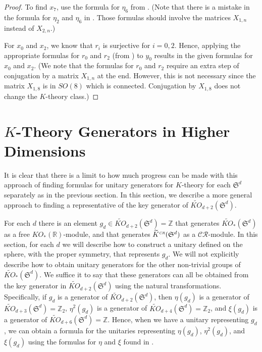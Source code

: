 \documentclass[12pt, reqno]{amsart}
\theoremstyle{definition}
\def\R{{\mathbb R}}
\def\Z{{\mathbb Z}}
\def\crr{^{\scriptscriptstyle {\it CR}}}
\newcommand{\fS}{\mathfrak S}
\begin{document}
\begin{proof}
To find $x_7$, use the formula for $\eta_6$ from \cite{Boer2020}. (Note that there is a mistake in the formula for $\eta_2$ and $\eta_6$ in \cite{Boer2020}. Those formulas should involve the matrices $X_{1,n}$ instead of $X_{2,n}$.)

For $x_0$ and $x_2$, we know that $r_i$ is surjective for $i = 0,2$. Hence, applying the appropriate formulas for $r_0$ and $r_2$ (from \cite{Boer2020}) to $y_0$ 
results in the given formulas for $x_0$ and $x_2$. (We note that the formulas for $r_0$ and $r_2$ require an extra step of conjugation by a matrix $X_{1, n}$ at the end. However, this is not necessary since the matrix $X_{1,8}$ is in $SO(8)$ which is connected. Conjugation by $X_{1,8}$ does not change the $K$-theory class.)
\end{proof}

\section{$K$-Theory Generators in Higher Dimensions} \label{Section:S^n unitaries}

It is clear that there is a limit to how much progress can be made with this approach of finding formulas for unitary generators for $K$-theory for each $\fS^d$ separately as in the previous section. In this section, we describe a more general approach to finding a representative of the key generator of $\widetilde{KO}_{d+2}(\fS^d)$.

For each $d$ there is an element $g_d \in \widetilde{KO}_{d+2}(\fS^d) = \Z$ that generates $\widetilde{KO}_*(\fS^d)$ as a free $KO_*(\R)$-module, and that generates $\widetilde{K}\crr(\fS^d)$ as a $\mathcal{CR}$-module. In this section, for each $d$ we will describe how to construct a unitary defined on the sphere, with the proper symmetry, that represents $g_d$. We will not explicitly describe how to obtain unitary generators for the other non-trivial groups of $\widetilde{KO}_*(\fS^d)$. We suffice it to say that these generators can all be obtained from the key generator in $\widetilde{KO}_{d+2}(\fS^d)$ using the natural transformations. Specifically, if $g_d$ is a generator of $\widetilde{KO}_{d+2}(\fS^d)$, 
then $\eta(g_d)$ is a generator of $\widetilde{KO}_{d+3}(\fS^d) = \Z_2$,
 $\eta^2(g_d)$ is a generator of $\widetilde{KO}_{d+4}(\fS^d) = \Z_2$,
 and $\xi(g_d)$ is a generator of $\widetilde{KO}_{d+6}(\fS^d) = \Z$. 
 Hence, when we have a unitary representing $g_d$, we can obtain a formula for the unitaries representing $\eta(g_d)$, $\eta^2(g_d)$, and $\xi(g_d)$ using the formulas for $\eta$ and $\xi$ found in \cite{Boer2020}.
\end{document}
